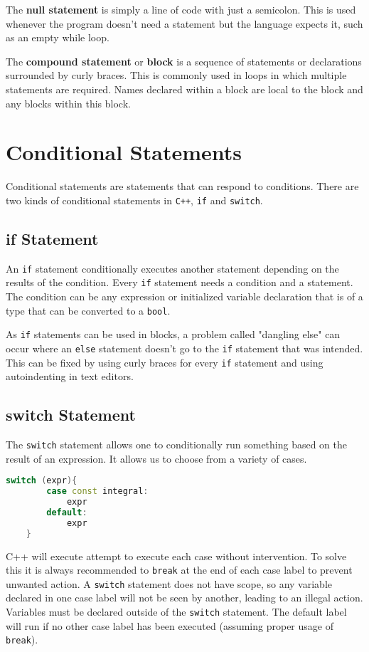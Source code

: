 \documentclass[12pt, a4paper]{report}
\begin{document}
The \textbf{null statement} is simply a line of code with just a semicolon.
This is used whenever the program doesn't need a statement but the language expects it, such as an empty while loop.

The \textbf{compound statement} or \textbf{block} is a sequence of statements or declarations surrounded by curly braces.
This is commonly used in loops in which multiple statements are required.
Names declared within a block are local to the block and any blocks within this block.
\section{Conditional Statements}
Conditional statements are statements that can respond to conditions.
There are two kinds of conditional statements in \verb|C++|, \verb|if| and \verb|switch|.
\subsection{if Statement}
An \verb|if| statement conditionally executes another statement depending on the results of the condition.
Every \verb|if| statement needs a condition and a statement.
The condition can be any expression or initialized variable declaration that is of a type that can be converted to a \verb|bool|.

As \verb|if| statements can be used in blocks, a problem called "dangling else" can occur where an \verb|else| statement doesn't go to the \verb|if| statement that was intended.
This can be fixed by using curly braces for every \verb|if| statement and using autoindenting in text editors.

\subsection{switch Statement}
The \verb|switch| statement allows one to conditionally run something based on the result of an expression.
It allows us to choose from a variety of cases.
\begin{lstlisting}[language=C++]
    switch (expr){
        case const integral:
            expr
        default:
            expr
    }
\end{lstlisting}
C++ will execute attempt to execute each case without intervention.
To solve this it is always recommended to \verb|break| at the end of each case label to prevent unwanted action.
A \verb|switch| statement does not have scope, so any variable declared in one case label will not be seen by another, leading to an illegal action.
Variables must be declared outside of the \verb|switch| statement.
The default label will run if no other case label has been executed (assuming proper usage of \verb|break|).
\end{document}
